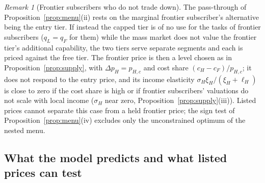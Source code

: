 \documentclass[11pt]{article}
\theoremstyle{definition}
\theoremstyle{remark}
\newtheorem{remark}{Remark}
\begin{document}
\begin{remark}[Frontier subscribers who do not trade down]\label{rem:segmented}
The pass-through of Proposition~\ref{prop:menu}(ii) rests on the marginal frontier subscriber's alternative being the entry tier. If instead the capped tier is of no use for the tasks of frontier subscribers ($q_L=q_F$ for them) while the mass market does not value the frontier tier's additional capability, the two tiers serve separate segments and each is priced against the free tier. The frontier price is then a level chosen as in Proposition~\ref{prop:supply}, with $\Delta p_H=p_{H,c}$ and cost share $(c_H-c_F)/p_{H,c}$; it does not respond to the entry price, and its income elasticity $\sigma_H\xi_H/(\xi_H+\ell_H)$ is close to zero if the cost share is high or if frontier subscribers' valuations do not scale with local income ($\sigma_H$ near zero, Proposition~\ref{prop:supply}(iii)). Listed prices cannot separate this case from a held frontier price; the sign test of Proposition~\ref{prop:menu}(iv) excludes only the unconstrained optimum of the nested menu.
\end{remark}

\subsection{What the model predicts and what listed prices can test}\label{app:predictions}
\end{document}

